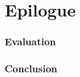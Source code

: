 \documentclass[12pt]{article}
\begin{document}
\pagebreak
\part{Epilogue}

\pagebreak
\section{Evaluation}
\section{Conclusion}



%
%
%


\end{document}

